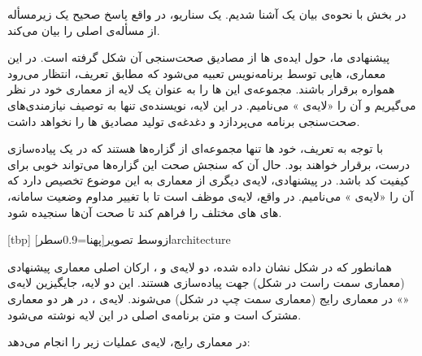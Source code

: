 در بخش  با نحوه‌ی بیان یک  آشنا شدیم. یک سناریو، در واقع پاسخ صحیح یک زیرمسأله از مسأله‌ی اصلی را بیان می‌کند.

 پیشنهادی ما، حول ایده‌ی  ‌ها از مصادیق صحت‌سنجی آن شکل گرفته است. در این معماری، ‌هایی توسط برنامه‌نویس تعبیه می‌شود که مطابق تعریف، انتظار می‌رود همواره برقرار باشند. مجموعه‌ی این ‌ها را به عنوان یک لایه از معماری   خود در نظر می‌گیریم و آن را «لایه‌ی » می‌نامیم. در این لایه، نویسنده‌ی  تنها به توصیف نیازمندی‌های صحت‌سنجی برنامه می‌پردازد و دغدغه‌ی تولید مصادیق ‌ها را نخواهد داشت.

با توجه به تعریف، خود ‌ها تنها مجموعه‌ای از گزاره‌ها هستند که در یک پیاده‌سازی درست، برقرار خواهند بود. حال آن که سنجش صحت این گزاره‌ها می‌تواند  خوبی برای کیفیت کد باشد. در  پیشنهادی، لایه‌ی دیگری از معماری  به این موضوع تخصیص دارد که آن را «لایه‌ی » می‌نامیم. در واقع، لایه‌ی  موظف است تا با تغییر مداوم وضعیت سامانه، ‌های ‌های مختلف را فراهم کند تا صحت آن‌ها سنجیده شود.

[tbp]
‌ازوسط
‌تصویر[پهنا=0.9‌سطر]{architecture}

همانطور که در شکل  نشان داده شده، دو لایه‌ی
 و ، ارکان اصلی معماری پیشنهادی (معماری سمت
راست در شکل) جهت پیاده‌سازی   هستند. این دو
لایه، جایگیزین لایه‌ی «» در معماری رایج (معماری سمت چپ در
شکل) می‌شوند. لایه‌ی ، در هر دو معماری مشترک
است و متن برنامه‌ی اصلی در این لایه نوشته می‌شود.

در معماری رایج، لایه‌ی  عملیات زیر را انجام می‌دهد:




